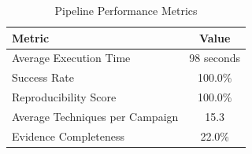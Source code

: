 \begin{table}[htbp]
\centering
\caption{Pipeline Performance Metrics}
\label{tab:performance-metrics}
\begin{tabular}{lc}
\hline
\textbf{Metric} & \textbf{Value} \\
\hline
Average Execution Time & 98 seconds \\
Success Rate & 100.0\% \\
Reproducibility Score & 100.0\% \\
Average Techniques per Campaign & 15.3 \\
Evidence Completeness & 22.0\% \\
\hline
\end{tabular}
\end{table}
